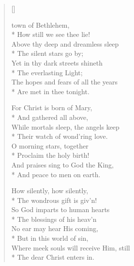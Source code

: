 \newHymn
{}

\begin{verse}[\versewidth]
\begin{altverse}
 town of Bethlehem,\\*
How still we see thee lie!\\
Above thy deep and dreamless sleep\\*
The silent stars go by;\\
Yet in thy dark streets shineth\\*
The everlasting Light;\\
The hopes and fears of all the years\\*
Are met in thee tonight.
\end{altverse}

\begin{altverse}
For Christ is born of Mary,\\*
And gathered all above,\\
While mortals sleep, the angels keep\\*
Their watch of wond'ring love.\\
O morning stars, together\\*
Proclaim the holy birth!\\
And praises sing to God the King,\\*
And peace to men on earth.
\end{altverse}

\begin{altverse}
How silently, how silently,\\*
The wondrous gift is giv'n!\\
So God imparts to human hearts\\*
The blessings of his heav'n\\
%
No ear may hear His coming,\\*
But in this world of sin,\\
Where meek souls will receive Him, still\\*
The dear Christ enters in.
\end{altverse}


\end{verse}
